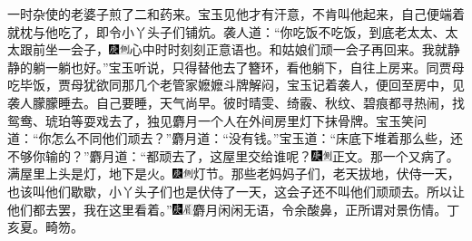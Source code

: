 一时杂使的老婆子煎了二和药来。宝玉见他才有汗意，不肯叫他起来，自己便端着就枕与他吃了，即令小丫头子们铺炕。袭人道：``你吃饭不吃饭，到底老太太、太太跟前坐一会子，{\includegraphics[width=3mm]{../Images/00004}\includegraphics[width=3mm]{../Images/00011}\footnotesize \kaishu 心中时时刻刻正意语也。}和姑娘们顽一会子再回来。我就静静的躺一躺也好。''宝玉听说，只得替他去了簪环，看他躺下，自往上房来。同贾母吃毕饭，贾母犹欲同那几个老管家嬷嬷斗牌解闷，宝玉记着袭人，便回至房中，见袭人朦朦睡去。自己要睡，天气尚早。彼时晴雯、绮霰、秋纹、碧痕都寻热闹，找鸳鸯、琥珀等耍戏去了，独见麝月一个人在外间房里灯下抹骨牌。宝玉笑问道：``你怎么不同他们顽去？''麝月道：``没有钱。''宝玉道：``床底下堆着那么些，还不够你输的？''麝月道：``都顽去了，这屋里交给谁呢？{\includegraphics[width=3mm]{../Images/00004}\includegraphics[width=3mm]{../Images/00011}\footnotesize \kaishu 正文。}那一个又病了。满屋里上头是灯，地下是火。{\includegraphics[width=3mm]{../Images/00004}\includegraphics[width=3mm]{../Images/00011}\footnotesize \kaishu 灯节。}那些老妈妈子们，老天拔地，伏侍一天，也该叫他们歇歇，小丫头子们也是伏侍了一天，这会子还不叫他们顽顽去。所以让他们都去罢，我在这里看着。''{\includegraphics[width=3mm]{../Images/00004}\includegraphics[width=3mm]{../Images/00010}\footnotesize \kaishu 麝月闲闲无语，令余酸鼻，正所谓对景伤情。丁亥夏。畸笏。}

